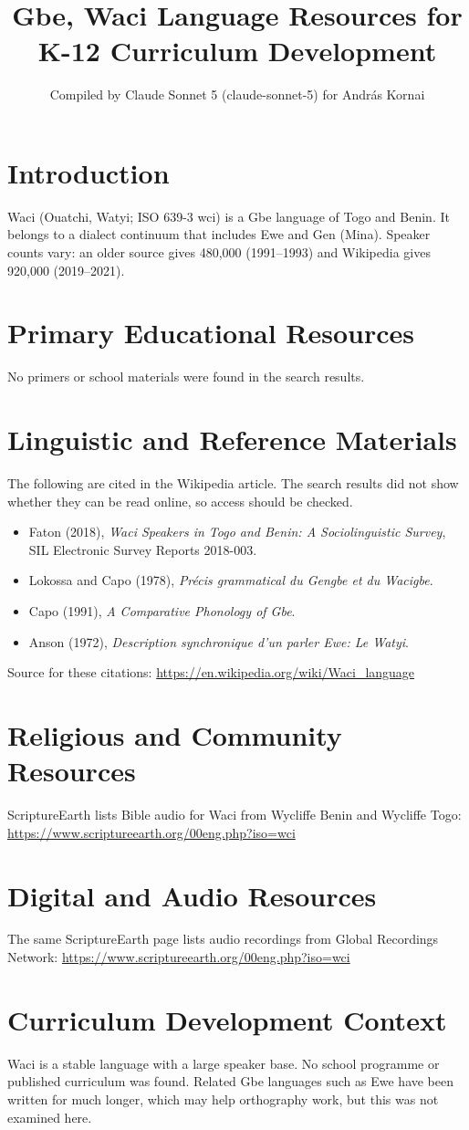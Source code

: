 \documentclass[12pt]{article}
\title{Gbe, Waci Language Resources for K-12 Curriculum Development}
\author{Compiled by Claude Sonnet 5 (claude-sonnet-5) for Andr\'as Kornai}
\date{}
\begin{document}
\maketitle

\section{Introduction}
Waci (Ouatchi, Watyi; ISO 639-3 wci) is a Gbe language of Togo and Benin. It belongs to a dialect continuum that includes Ewe and Gen (Mina). Speaker counts vary: an older source gives 480,000 (1991--1993) and Wikipedia gives 920,000 (2019--2021).

\section{Primary Educational Resources}
No primers or school materials were found in the search results.

\section{Linguistic and Reference Materials}
The following are cited in the Wikipedia article. The search results did not show whether they can be read online, so access should be checked.
\begin{itemize}
\item Faton (2018), \emph{Waci Speakers in Togo and Benin: A Sociolinguistic Survey}, SIL Electronic Survey Reports 2018-003.
\item Lokossa and Capo (1978), \emph{Pr\'ecis grammatical du Gengbe et du Wacigbe}.
\item Capo (1991), \emph{A Comparative Phonology of Gbe}.
\item Anson (1972), \emph{Description synchronique d'un parler Ewe: Le Watyi}.
\end{itemize}
Source for these citations: \url{https://en.wikipedia.org/wiki/Waci_language}

\section{Religious and Community Resources}
ScriptureEarth lists Bible audio for Waci from Wycliffe Benin and Wycliffe Togo: \url{https://www.scriptureearth.org/00eng.php?iso=wci}

\section{Digital and Audio Resources}
The same ScriptureEarth page lists audio recordings from Global Recordings Network: \url{https://www.scriptureearth.org/00eng.php?iso=wci}

\section{Curriculum Development Context}
Waci is a stable language with a large speaker base. No school programme or published curriculum was found. Related Gbe languages such as Ewe have been written for much longer, which may help orthography work, but this was not examined here.
\end{document}
